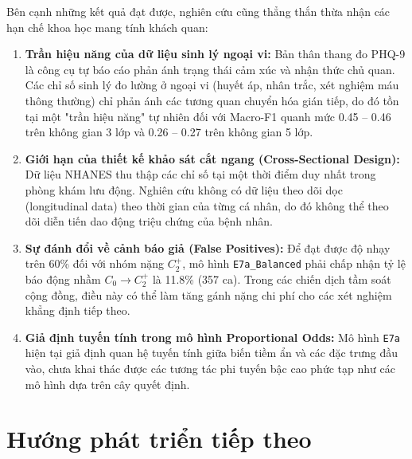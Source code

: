 Bên cạnh những kết quả đạt được, nghiên cứu cũng thẳng thắn thừa nhận các hạn chế khoa học mang tính khách quan:
\begin{enumerate}
    \item \textbf{Trần hiệu năng của dữ liệu sinh lý ngoại vi:} Bản thân thang đo PHQ-9 là công cụ tự báo cáo phản ánh trạng thái cảm xúc và nhận thức chủ quan. Các chỉ số sinh lý đo lường ở ngoại vi (huyết áp, nhân trắc, xét nghiệm máu thông thường) chỉ phản ánh các tương quan chuyển hóa gián tiếp, do đó tồn tại một "trần hiệu năng" tự nhiên đối với Macro-F1 quanh mức 0.45 -- 0.46 trên không gian 3 lớp và 0.26 -- 0.27 trên không gian 5 lớp.
    \item \textbf{Giới hạn của thiết kế khảo sát cắt ngang (Cross-Sectional Design):} Dữ liệu NHANES thu thập các chỉ số tại một thời điểm duy nhất trong phòng khám lưu động. Nghiên cứu không có dữ liệu theo dõi dọc (longitudinal data) theo thời gian của từng cá nhân, do đó không thể theo dõi diễn tiến dao động triệu chứng của bệnh nhân.
    \item \textbf{Sự đánh đổi về cảnh báo giả (False Positives):} Để đạt được độ nhạy trên 60\% đối với nhóm nặng $C_2^+$, mô hình \texttt{E7a\_Balanced} phải chấp nhận tỷ lệ báo động nhầm $C_0 \to C_2^+$ là 11.8\% (357 ca). Trong các chiến dịch tầm soát cộng đồng, điều này có thể làm tăng gánh nặng chi phí cho các xét nghiệm khẳng định tiếp theo.
    \item \textbf{Giả định tuyến tính trong mô hình Proportional Odds:} Mô hình \texttt{E7a} hiện tại giả định quan hệ tuyến tính giữa biến tiềm ẩn và các đặc trưng đầu vào, chưa khai thác được các tương tác phi tuyến bậc cao phức tạp như các mô hình dựa trên cây quyết định.
\end{enumerate}

\section{Hướng phát triển tiếp theo}
\label{sec:huong-phat-trien}


